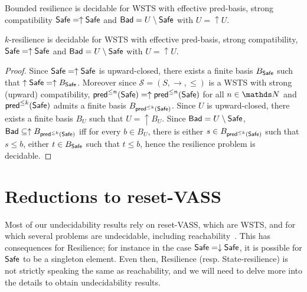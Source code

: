 \begin{corollary}\label{B-up-up}
{\sc Bounded resilience}  is decidable for WSTS with effective pred-basis,
strong compatibility
 $\textsf{Safe}=\uparrow \textsf{Safe}$
and $\textsf{Bad}=U \setminus \textsf{Safe}$ with $U = \uparrow U$.
\end{corollary}


\begin{theorem}\label{k-up-up}
{\sc $k$-resilience}  is decidable for WSTS with effective pred-basis, strong %
compatibility, $\textsf{Safe}=\uparrow \textsf{Safe}$
and $\textsf{Bad}=U \setminus \textsf{Safe}$  with $U = \uparrow U$.
\end{theorem}

\begin{proof}
Since $\textsf{Safe}=\uparrow \textsf{Safe}$ is upward-closed, there exists a finite basis $B_{ \textsf{Safe}}$ such that $\uparrow \textsf{Safe} = \uparrow B_{\textsf{Safe}}$. 
Moreover since $\mathscr{S}=(S,\rightarrow,\leq)$ is a WSTS with strong (upward) compatibility,  $\textsf{pred}^{\leq n}(\textsf{Safe})=\uparrow \textsf{pred}^{\leq n}(\textsf{Safe})$ for all $n\in \N$ and $\textsf{pred}^{\leq k}(\textsf{Safe})$ admits a finite basis $B_{\textsf{pred}^{\leq k}(\textsf{Safe})}$. %
Since $U$  is upward-closed, there exists a finite basis $B_{U}$ such that $U = \uparrow B_{U}$. %
Since $\textsf{Bad} = U \setminus \textsf{Safe}$, $\textsf{Bad} \subseteq \uparrow B_{\textsf{pred}^{\leq k}(\textsf{Safe})}$ iff for every $b \in B_{U}$, there is either $s \in B_{\textsf{pred}^{\leq k}(\textsf{Safe})}$ such that $s \leq b$, either $t \in B_{\textsf{Safe}}$ such that $t\leq b$,
hence the resilience problem is decidable.
\end{proof}


\section{Reductions to reset-VASS}

Most of our undecidability results rely on reset-VASS, which are WSTS, and for which several problems are undecidable, including reachability~\cite{araki1976PN, dufourd1998reset}. This has consequences for {\sc Resilience}; for instance in the case $\textsf{Safe} = \downarrow \textsf{Safe}$, it is possible for $\textsf{Safe}$ to be a singleton element. Even then, {\sc Resilience} (resp. {\sc State-resilience}) is not strictly speaking the same as reachability, and we will need to delve more into the details to obtain undecidability results. 

